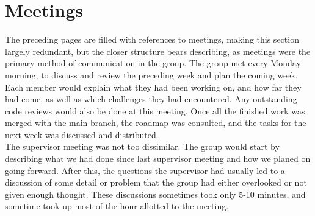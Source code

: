 \section{Meetings}
The preceding pages are filled with references to meetings, making this section largely redundant, but the closer structure bears describing, as meetings were the primary method of communication in the group. The group met every Monday morning, to discuss and review the preceding week and plan the coming week. Each member would explain what they had been working on, and how far they had come, as well as which challenges they had encountered. Any outstanding code reviews would also be done at this meeting. Once all the finished work was merged with the main branch, the roadmap was consulted, and the tasks for the next week was discussed and distributed.\\
The supervisor meeting was not too dissimilar. The group would start by describing what we had done since last supervisor meeting and how we planed on going forward. After this, the questions the supervisor had usually led to a discussion of some detail or problem that the group had either overlooked or not given enough thought. These discussions  sometimes took only 5-10 minutes, and sometime took up most of the hour allotted to the meeting.